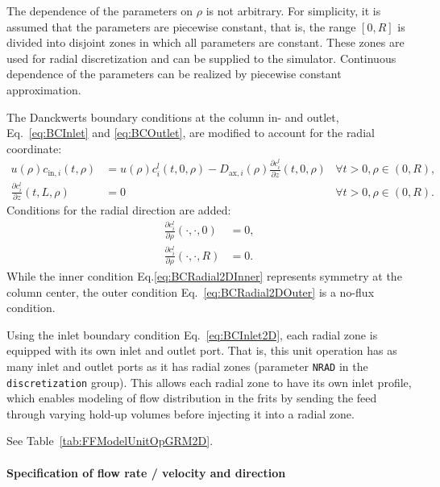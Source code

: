 The dependence of the parameters on $\rho$ is not arbitrary.
For simplicity, it is assumed that the parameters are piecewise constant, that is, the range $[0, R]$ is divided into disjoint zones in which all parameters are constant.
These zones are used for radial discretization and can be supplied to the simulator.
Continuous dependence of the parameters can be realized by piecewise constant approximation.

The Danckwerts boundary conditions at the column in- and outlet, Eq.~\eqref{eq:BCInlet} and \eqref{eq:BCOutlet}, are modified to account for the radial coordinate:
\begin{subequations}\label{eq:BCAxial2D}
\begin{align}
	u(\rho) c_{\text{in},i}(t,\rho) &= u(\rho) c^l_i(t,0,\rho) - D_{\text{ax},i}(\rho) \frac{\partial c^l_i}{\partial z}(t, 0, \rho) \label{eq:BCInlet2D} & \forall t > 0, \rho \in (0,R), \\
	\frac{\partial c^l_i}{\partial z}(t, L, \rho) &= 0 & \forall t > 0, \rho \in (0,R). \label{eq:BCOutlet2D}
\end{align}
\end{subequations}
Conditions for the radial direction are added:
\begin{subequations}\label{eq:BCRadial2D}
\begin{align}
	\frac{\partial{c^l_i}}{\partial \rho}(\cdot, \cdot, 0) &= 0, \label{eq:BCRadial2DInner} \\
	\frac{\partial{c^l_i}}{\partial \rho}(\cdot, \cdot, R) &= 0. \label{eq:BCRadial2DOuter}
\end{align}
\end{subequations}
While the inner condition Eq.\eqref{eq:BCRadial2DInner} represents symmetry at the column center, the outer condition Eq.~\eqref{eq:BCRadial2DOuter} is a no-flux condition.

Using the inlet boundary condition Eq.~\eqref{eq:BCInlet2D}, each radial zone is equipped with its own inlet and outlet port.
That is, this unit operation has as many inlet and outlet ports as it has radial zones (parameter \texttt{NRAD} in the \texttt{discretization} group).
This allows each radial zone to have its own inlet profile, which enables modeling of flow distribution in the frits by sending the feed through varying hold-up volumes before injecting it into a radial zone.

See Table~\ref{tab:FFModelUnitOpGRM2D}.

\paragraph{Specification of flow rate / velocity and direction}
\label{par:MUOPGRMflow2D}

